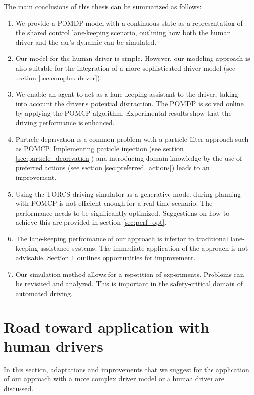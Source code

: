\vspace{1em}
\noindent
The main conclusions of this thesis can be summarized as follows:
\begin{enumerate}
    \item We provide a POMDP model with a continuous state as a representation of the shared control lane-keeping scenario, outlining how both the human driver and the car's dynamic can be simulated. 
    \item Our model for the human driver is simple. However, our modeling approach is also suitable for the integration of a more sophisticated driver model (see section \ref{sec:complex-driver}).
    \item We enable an agent to act as a lane-keeping assistant to the driver, taking into account the driver's potential distraction. The POMDP is solved online by applying the POMCP algorithm. Experimental results show that the driving performance is enhanced.
    \item Particle deprivation is a common problem with a particle filter approach such as POMCP. Implementing particle injection (see section \ref{sec:particle_deprivation}) and introducing domain knowledge by the use of preferred actions (see section \ref{sec:preferred_actions}) leads to an improvement.
    \item Using the TORCS driving simulator as a generative model during planning with POMCP is not efficient enough for a real-time scenario. The performance needs to be significantly optimized. Suggestions on how to achieve this are provided in section \ref{sec:perf_opt}.
    \item The lane-keeping performance of our approach is inferior to traditional lane-keeping assistance systems. The immediate application of the approach is not advisable. Section \ref{sec:future} outlines opportunities for improvement.
    \item Our simulation method allows for a repetition of experiments. Problems can be revisited and analyzed. This is important in the safety-critical domain of automated driving.
\end{enumerate}

\section{Road toward application with human drivers}
\label{sec:future}

In this section, adaptations and improvements that we suggest for the application of our approach with a more complex driver model or a human driver are discussed. 

